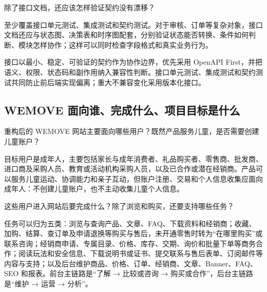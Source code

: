 \documentclass[UTF8,a4paper,11pt]{ctexart}
\begin{document}
\begin{membermsg}
除了接口文档，还应该怎样验证契约没有漂移？
\end{membermsg}

\begin{gptmsg}
至少覆盖接口单元测试、集成测试和契约测试。对于审核、订单等复杂对象，接口文档还应与状态图、决策表和时序图配套，分别验证状态能否转换、条件如何判断、模块怎样协作；这样可以同时检查字段格式和真实业务行为。
\end{gptmsg}

\begin{decisionbox}
接口以最小、稳定、可验证的契约作为协作边界，优先采用 OpenAPI First，并把语义、权限、状态码和副作用纳入兼容性判断。接口单元测试、集成测试和契约测试共同防止前后端实现偏离；重大不兼容变化采用版本化接口。
\end{decisionbox}

\subsection{WEMOVE 面向谁、完成什么、项目目标是什么}

\begin{membermsg}
重构后的 WEMOVE 网站主要面向哪些用户？既然产品服务儿童，是否需要创建儿童账户？
\end{membermsg}

\begin{gptmsg}
目标用户是成年人，主要包括家长与成年消费者、礼品购买者、零售商、批发商、进口商及采购人员、教育或活动机构采购人员，以及已合作或潜在经销商。产品可以服务儿童运动、协调能力和亲子互动，但账户注册、交易和个人信息收集应面向成年人：不创建儿童账户，也不主动收集儿童个人信息。
\end{gptmsg}

\begin{membermsg}
这些用户进入网站后要完成什么？除了浏览和购买，还要支持哪些任务？
\end{membermsg}

\begin{gptmsg}
任务可以归为五类：浏览与查询产品、文章、FAQ、下载资料和经销商；收藏、加购、结算、查订单及申请退换等购买与售后，未开通零售时转为“在哪里购买”或联系咨询；经销商申请、专属目录、价格、库存、交期、询价和批量下单等商务合作；阅读玩法和安全信息、下载说明书或证书、提交联系与售后表单、订阅邮件等内容与支持；以及后台维护商品、价格、订单、经销商、文章、Banner、FAQ、SEO 和报表。前台主链路是“了解 → 比较或咨询 → 购买或合作”，后台主链路是“维护 → 运营 → 分析”。
\end{gptmsg}
\end{document}
